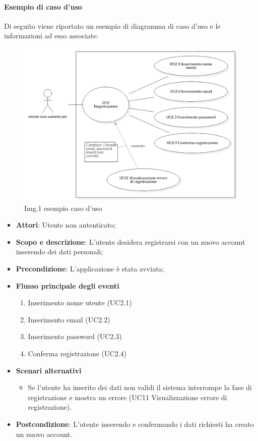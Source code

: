 			\paragraph{Esempio di caso d’uso}
				Di seguito viene riportato un esempio di diagramma di caso d’uso e le informazioni ad esso associate:
					\begin{figure}[H]
    						\centering
    						\includegraphics[width=1.0\textwidth]{res/images/esempio_caso_d_uso.png}
						\caption{Img.1 esempio caso d'uso}
						\label{fig:Img.1 esempio caso d'uso: UC2 Registrazione}
					\end{figure}
				\begin{itemize}
					\item\textbf{Attori}: Utente non autenticato;
					\item\textbf{Scopo e descrizione}: L’utente desidera registrarsi con un nuovo account inserendo dei dati personali;
					\item\textbf{Precondizione}: L’applicazione è stata avviata;
					\item\textbf{Flusso principale degli eventi}
						\begin{enumerate}
							\item Inserimento nome utente (UC2.1)
							\item Inserimento email (UC2.2)
							\item Inserimento password (UC2.3)
							\item Conferma registrazione (UC2.4)
						\end{enumerate}
					\item\textbf{Scenari alternativi}
						\begin{itemize}
							\item Se l’utente ha inserito dei dati non validi il sistema interrompe la fase di registrazione e mostra un errore (UC11 Visualizzazione errore di registrazione).
						\end{itemize}
					\item\textbf{Postcondizione}: L’utente inserendo e confermando i dati richiesti ha creato un nuovo account.
				\end{itemize}
			

